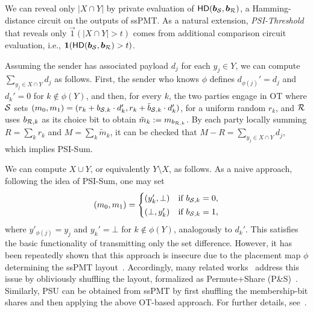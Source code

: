  We can reveal only \(|X\cap Y|\) by private evaluation of $\mathsf{HD}(\bm{b}_{\mathcal{S}}, \bm{b}_{\mathcal{R}})$, a Hamming-distance circuit on the outputs of ssPMT.
As a natural extension, {\em PSI-Threshold} that reveals only \(\vec 1(|X\cap Y| > t)\) comes from additional comparison circuit evaluation, i.e., $\bm{1}(\mathsf{HD}(\bm{b}_{\mathcal{S}}, \bm{b}_{\mathcal{R}}) > t)$.

 Assuming the sender has associated payload $d_j$ for each $y_j \in Y$, we can compute $\sum_{y_j \in X\cap Y} d_j$ as follows.
First, the sender who knows $\phi$ defines \(d_{\phi(j)}'=d_j\) and \(d_k'=0\) for $k \notin \phi(Y)$,
and then, for every $k$, the two parties engage in OT where $\mathcal{S}$ sets
$(m_0,m_1)=
(r_k + b_{\mathcal{S},k}\cdot d_k', r_k + \bar{b}_{\mathcal{S}, k}\cdot d_k')$,
for a uniform random $r_k$, and $\mathcal{R}$ uses \(b_{\mathcal{R}, k}\) as its choice bit to obtain $\tilde m_k := m_{b_{\mathcal{R},k}}$.
By each party locally summing \(R=\sum_{k} r_k\) and \(M=\sum_{k}\tilde m_k \), it can be checked that $M-R=\sum_{y_j\in X\cap Y}d_j$, which implies PSI-Sum.

 We can compute $X\cup Y$, or equivalently $Y\setminus X$, as follows.
As a naive approach, following the idea of PSI-Sum, one may set 
\[
(m_0,m_1)=
\begin{cases}
(y_k',\bot) & \text{if } b_{\mathcal{S},k}=0,\\[2pt]
(\bot,y_k') & \text{if } b_{\mathcal{S},k}=1,
\end{cases}
\]
where $y'_{\phi(j)} = y_j$ and $y_k' = \bot$ for $k \notin \phi(Y)$, analogously to $d_k'$.
This satisfies the basic functionality of transmitting only the set difference.
However, it has been repeatedly shown that this approach is insecure due to the placement map $\phi$ determining the ssPMT layout~\cite{KRTW19,JSZG24,LLT24}.
Accordingly, many related works~\cite{GMR+21,CSSW24,JSZG24,TBZ+25,WCS+26} address this issue by obliviously shuffling the layout, formalized as Permute+Share (P\&S)~\cite{CGP20,PRRS24}.
Similarly, PSU can be obtained from ssPMT by first shuffling the membership-bit shares and then applying the above OT-based approach.
For further details, see~\cite{CSSW24}.

